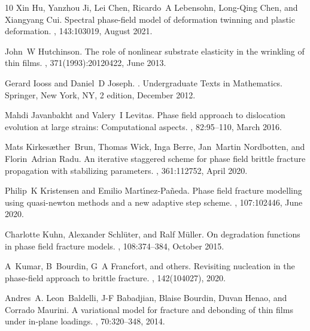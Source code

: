 \documentclass[10pt]{article}
\begin{document}
\begin{thebibliography}{10}
    Xin Hu, Yanzhou Ji, Lei Chen, Ricardo~A Lebensohn, Long-Qing Chen, and Xiangyang Cui.
    \newblock Spectral phase-field model of deformation twinning and plastic deformation.
    , 143:103019, August 2021.

    John~W Hutchinson.
    \newblock The role of nonlinear substrate elasticity in the wrinkling of thin films.
    , 371(1993):20120422, June 2013.

    Gerard Iooss and Daniel~D Joseph.
    .
    \newblock Undergraduate Texts in Mathematics. Springer, New York, NY, 2 edition, December 2012.

    Mahdi Javanbakht and Valery~I Levitas.
    \newblock Phase field approach to dislocation evolution at large strains: Computational aspects.
    , 82:95--110, March 2016.

    Mats Kirkes{\ae}ther~Brun, Thomas Wick, Inga Berre, Jan~Martin Nordbotten, and Florin~Adrian Radu.
    \newblock An iterative staggered scheme for phase field brittle fracture propagation with stabilizing parameters.
    , 361:112752, April 2020.

    Philip~K Kristensen and Emilio Mart{\'\i}nez-Pa{\~n}eda.
    \newblock Phase field fracture modelling using quasi-newton methods and a new adaptive step scheme.
    , 107:102446, June 2020.

    Charlotte Kuhn, Alexander Schl{\"u}ter, and Ralf M{\"u}ller.
    \newblock On degradation functions in phase field fracture models.
    , 108:374--384, October 2015.

    A~Kumar, B~Bourdin, G~A Francfort, and {others}.
    \newblock Revisiting nucleation in the phase-field approach to brittle fracture.
    , 142(104027), 2020.

    Andres~A. Leon~Baldelli, J-F Babadjian, Blaise Bourdin, Duvan Henao, and Corrado Maurini.
    \newblock A variational model for fracture and debonding of thin films under in-plane loadings.
    , 70:320--348, 2014.


\end{thebibliography}
\end{document}
